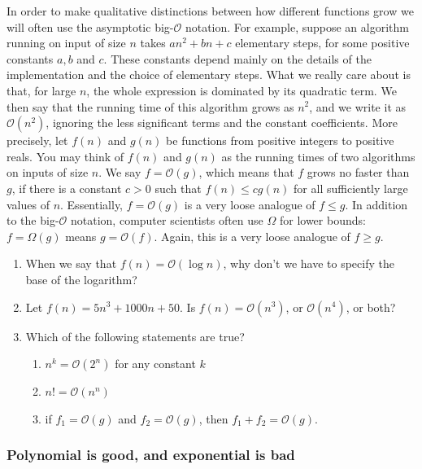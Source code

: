 \documentclass[fleqn,a4paper]{article}
\providecommand{\tightlist}{\setlength{\itemsep}{0pt}\setlength{\parskip}{0pt}}
\renewcommand{\footnote}[1]{\sidenotetext[{\color{white}0}\!\!]{\footnotesize #1}}
\theoremstyle{definition}
\theoremstyle{definition}
\theoremstyle{definition}
\theoremstyle{definition}
\theoremstyle{remark}
\begin{document}
In order to make qualitative distinctions between how different functions grow we will often use the asymptotic big-\(\mathcal{O}\) notation.
For example, suppose an algorithm running on input of size \(n\) takes \(a n^2+bn+c\) elementary steps, for some positive constants \(a, b\) and \(c\).
These constants depend mainly on the details of the implementation and the choice of elementary steps.
What we really care about is that, for large \(n\), the whole expression is dominated by its quadratic term.
We then say that the running time of this algorithm grows as \(n^2\), and we write it as \(\mathcal{O}(n^2)\), ignoring the less significant terms and the constant coefficients.
More precisely, let \(f(n)\) and \(g(n)\) be functions from positive integers to positive reals.
You may think of \(f(n)\) and \(g(n)\) as the running times of two algorithms on inputs of size \(n\).
We say \(f=\mathcal{O}(g)\),\footnote{\(f=\mathcal{O}(g)\) is pronounced as ``\(f\) is big-oh of \(g\)''.} which means that \(f\) grows no faster than \(g\), if there is a constant \(c>0\) such that \(f(n)\leqslant c g(n)\) for all sufficiently large values of \(n\).
Essentially, \(f=\mathcal{O}(g)\) is a very loose analogue of \(f \leqslant g\).
In addition to the big-\(\mathcal{O}\) notation, computer scientists often use \(\Omega\) for lower bounds: \(f=\Omega (g)\) means \(g=\mathcal{O}(f)\).
Again, this is a very loose analogue of \(f \geqslant g\).

\begin{enumerate}
\def\labelenumi{\arabic{enumi}.}
\tightlist
\item
  When we say that \(f(n)=\mathcal{O}(\log n)\), why don't we have to specify the base of the logarithm?
\item
  Let \(f(n)=5n^3+1000n+50\). Is \(f(n)=\mathcal{O}(n^3)\), or \(\mathcal{O}(n^4)\), or both?
\item
  Which of the following statements are true?

  \begin{enumerate}
  \def\labelenumii{\alph{enumii}.}
  \tightlist
  \item
    \(n^k=\mathcal{O}(2^n)\) for any constant \(k\)
  \item
    \(n!=\mathcal{O}(n^n)\)
  \item
    if \(f_1=\mathcal{O}(g)\) and \(f_2=\mathcal{O}(g)\), then \(f_1+f_2=\mathcal{O}(g)\).
  \end{enumerate}
\end{enumerate}

\hypertarget{polynomial-is-good-and-exponential-is-bad}{%
\subsubsection{Polynomial is good, and exponential is bad}\label{polynomial-is-good-and-exponential-is-bad}}
\end{document}
